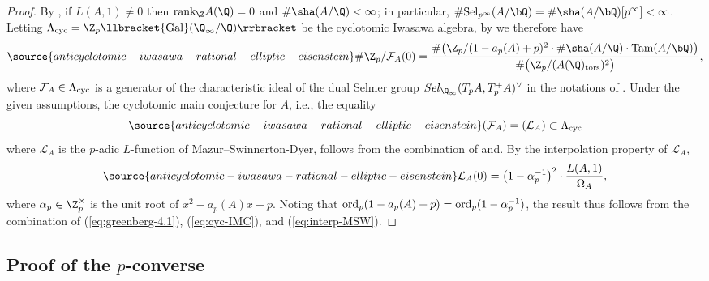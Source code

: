 \begin{proof}
By \cite{kolyvagin-mw-sha}, if $L(A,1)\neq 0$ then ${\rm rank}_\Z A(\Q)=0$ and $\#\sha(A/\Q)<\infty$; in particular, $\#{\rm Sel}_{p^\infty}(A/\bQ)=\#\sha(A/\bQ)[p^\infty]<\infty$. Letting $\Lambda_{\rm cyc}=\Z_p\llbracket{\rm Gal}(\Q_\infty/\Q)\rrbracket$ be the cyclotomic Iwasawa algebra, by \cite[Thm.~4.1]{greenberg-cetraro} we therefore have
\begin{equation}\label{eq:greenberg-4.1}
\source{anticyclotomic-iwasawa-rational-elliptic-eisenstein}
\#\Z_p/\mathcal{F}_A(0)=\frac{\#\bigl(\Z_p/(1-a_p(A)+p)^2\cdot\#\sha(A/\Q)\cdot{\rm Tam}(A/\bQ)\bigr)}{\#\bigl(\Z_p/(A(\Q)_{\rm tors})^2\bigr)},
\end{equation}
where $\mathcal{F}_A\in\Lambda_{\rm cyc}$ is a generator of the characteristic ideal of the dual Selmer group $Sel_{\Q_\infty}(T_pA,T_p^+A)^\vee$ in the notations of \cite[\S{3.6.1}]{skinner-urban}. Under the given assumptions, the cyclotomic main conjecture for $A$, i.e., the equality
\begin{equation}\label{eq:cyc-IMC}
\source{anticyclotomic-iwasawa-rational-elliptic-eisenstein}
(\mathcal{F}_A)=(\mathcal{L}_A)\subset\Lambda_{\rm cyc}
\end{equation}
where $\mathcal{L}_A$ is the $p$-adic $L$-function of Mazur--Swinnerton-Dyer, follows from the combination of \cite[Thm.~12.5]{kato-euler-systems} and\cite[Thm.~1.3]{greenvats}. By the interpolation property of $\mathcal{L}_A$,
\begin{equation}\label{eq:interp-MSW}
\source{anticyclotomic-iwasawa-rational-elliptic-eisenstein}
\mathcal{L}_A(0)=\bigl(1-\alpha_p^{-1}\bigr)^2\cdot\frac{L(A,1)}{\Omega_A},
\end{equation}
where $\alpha_p\in\Z_p^\times$ is the unit root of $x^2-a_p(A)x+p$. Noting that ${\rm ord}_p(1-a_p(A)+p)={\rm ord}_p(1-\alpha_p^{-1})$, the result thus follows from the combination of (\ref{eq:greenberg-4.1}), (\ref{eq:cyc-IMC}), and (\ref{eq:interp-MSW}).
\end{proof}



\subsection{Proof of the \texorpdfstring{$p$}{p}-converse}

